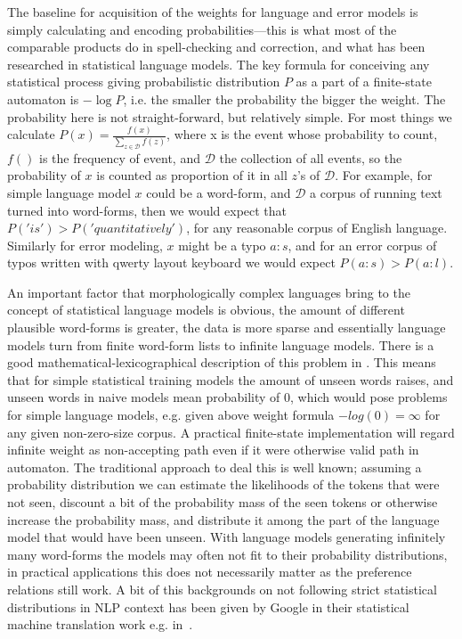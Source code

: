 \documentclass[officiallayout]{unihelcompling}
\begin{document}
The baseline for acquisition of the weights for language and error models is
simply calculating and encoding probabilities---this is what most of the
comparable products do in spell-checking and correction, and what has been
researched in statistical language models. The key formula for conceiving any
statistical process giving probabilistic distribution $P$ as a part of a
finite-state automaton is $-\log P$, i.e. the smaller the probability the
bigger the weight. The probability here is not straight-forward, but relatively
simple. For most things we calculate $P(x) = \frac{f(x)}{\sum_{z \in
\mathcal{D}} f(z)}$, where x is the event whose probability to count, $f()$ is
the frequency of event, and $\mathcal{D}$ the collection of all events, so the
probability of $x$ is counted as proportion of it in all $z$'s of
$\mathcal{D}$. For example, for simple language model $x$ could be a word-form,
and $\mathcal{D}$ a corpus of running text turned into word-forms, then we
would expect that $P('is') > P('quantitatively')$, for any reasonable corpus of
English language. Similarly for error modeling, $x$ might be a typo $a:s$, and
for an error corpus of typos written with qwerty layout keyboard we would
expect $P(a:s) > P(a:l)$.

An important factor that morphologically complex languages bring to the
concept of statistical language models is obvious, the amount of different
plausible word-forms is greater, the data is more sparse and essentially
language models turn from finite word-form lists to infinite language models.
There is a good mathematical-lexicographical description of this problem in
\citep{kornai2002many}. This means that for simple statistical training models
the amount of unseen words raises, and unseen words in naive models mean
probability of $0$, which would pose problems for simple language models, e.g.
given above weight formula $-log(0) = \infty$ for any given non-zero-size
corpus. A practical finite-state implementation will regard infinite weight
as non-accepting path even if it were otherwise valid path in automaton. The
traditional approach to deal this is well known;
assuming a probability distribution we can estimate the likelihoods of the
tokens that were not seen, discount a bit of the probability mass of the seen
tokens or otherwise increase the probability mass, and distribute it among the
part of the language model that would have been unseen. With language models
generating infinitely many word-forms the models may often not fit to their
probability distributions, in practical applications this does not necessarily
matter as the preference relations still work. A bit of this backgrounds on not
following strict statistical distributions in NLP context has been given by
Google in their statistical machine translation work e.g. 
in~\citet{brants2007large}.
\end{document}
